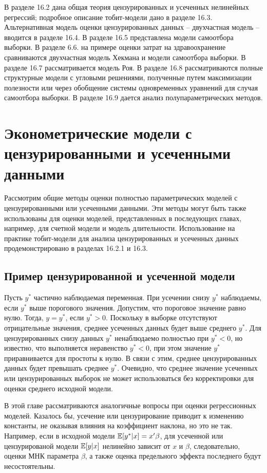 В разделе 16.2 дана общая теория цензурированных и усеченных нелинейных регрессий; подробное описание тобит-модели дано в разделе 16.3. Альтернативная модель оценки цензурированных данных -- двухчастная модель -- вводится в разделе 16.4. В разделе 16.5 представлена модели самоотбора выборки. В разделе 6.6. на примере оценки затрат на здравоохранение сравниваются двухчастная модель Хекмана и модели самоотбора выборки. В разделе 16.7 рассматривается модель Роя. В разделе 16.8 рассматриваются полные структурные модели с угловыми решениями, полученные путем максимизации полезности или через обобщение системы одновременных уравнений для случая самоотбора выборки. В разделе 16.9 дается анализ полупараметрических методов.


\section{Эконометрические модели с цензурированными и усеченными данными}

Рассмотрим общие методы оценки полностью параметрических моделей с цензурированными или усеченными данными. Эти методы могут быть также использованы для оценки моделей, представленных в последующих главах, например, для счетной модели и модель длительности. Использование на практике тобит-модели для анализа цензурированных и усеченных данных продемонстрировано в разделах 16.2.1 и 16.3.

\subsection{Пример цензурированной и усеченной модели}

Пусть $y^* $ частично наблюдаемая переменная. При усечении снизу $y^* $ наблюдаемы, если $y^* $ выше порогового значения. Допустим, что пороговое значение равно нулю. Тогда, $y=y^* $, если $y^* >0$. Поскольку в выборке отсутствуют отрицательные значения, среднее усеченных данных будет выше среднего $y^* $. Для цензурированных снизу данных $y^* $ ненаблюдаемо полностью при $y^* <0$, но известно, что выполняется неравенство $y^* <0$, при этом значение $y^* $ приравнивается для простоты к нулю. В связи с этим, среднее цензурированных данных будет превышать среднее $y^* $. Очевидно, что среднее значение усеченных или цензурированных выборок не может использоваться без корректировки для оценки среднего исходной модели.

В этой главе рассматриваются аналогичные вопросы при оценки регрессионных моделей. Казалось бы, усечение или цензурирование приводит к изменению константы, не оказывая влияния на коэффициент наклона, но это не так. Например, если в исходной модели $\mathbb{E}[y^* |x]=x'\beta$, для усеченной или цензурированой модели $\mathbb{E}[y|x]$ нелинейно зависит от $x$ и $\beta$, следовательно, оценки МНК параметра $\beta$, а также оценка предельного эффекта последнего будут несостоятельны.

